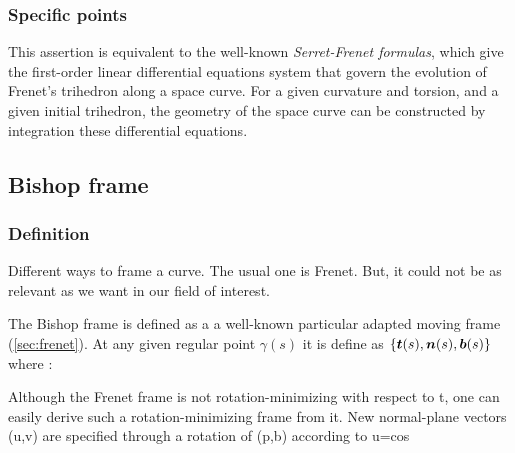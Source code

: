 \subsubsection{Specific points}

This assertion is equivalent to the well-known \emph{Serret-Frenet formulas}, which give the first-order linear differential equations system that govern the evolution of Frenet's trihedron along a space curve. For a given curvature and torsion, and a given initial trihedron, the geometry of the space curve can be constructed by integration these differential equations.


\subsection{Bishop frame}\label{sec:bishop}

\subsubsection{Definition}
Different ways to frame a curve. The usual one is Frenet. But, it could not be as relevant as we want in our field of interest.

The Bishop frame is defined as a a well-known particular adapted moving frame (\cref{sec:frenet}). At any given regular point $\gamma(s)$ it is define as $\{\boldsymbol{t}(s),\boldsymbol{n}(s),\boldsymbol{b}(s)\}$ where :

\cite{Guggenheimer1989}
\cite{Klok1986}

Although the Frenet frame is not rotation-minimizing with respect to t, one can easily derive such a rotation-minimizing frame from it. New normal-plane vectors (u,v) are specified through a rotation of (p,b) according to u=cos


